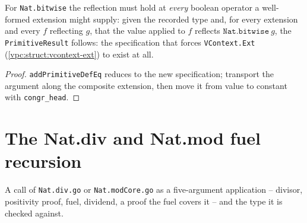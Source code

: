 \begin{theorem}
\label{vpc:thm:data-mkresultbitwise}\leanok
{}

 For \texttt{Nat.bitwise} the reflection must hold at \emph{every} boolean
operator a well-formed extension might supply: given the recorded type and, for every extension
and every $f$ reflecting $g$, that the value applied to $f$ reflects
$\mathtt{Nat.bitwise}\ g$, the \texttt{PrimitiveResult} follows: the specification that forces
\texttt{VContext.Ext} (\ref{vpc:struct:vcontext-ext}) to exist at all.
\end{theorem}
\begin{proof}\leanok
{}
 \texttt{addPrimitiveDefEq} reduces to the new specification; transport the argument
along the composite extension, then move it from value to constant with \texttt{congr\_head}.
\end{proof}

\section{The Nat.div and Nat.mod fuel recursion}

\begin{definition}
\label{vpc:def:natgocall}
\leanok
{}

 A call of \texttt{Nat.div.go} or \texttt{Nat.modCore.go} as a five-argument
application -- divisor, positivity proof, fuel, dividend, a proof the fuel covers it -- and the
type it is checked against.
\end{definition}

